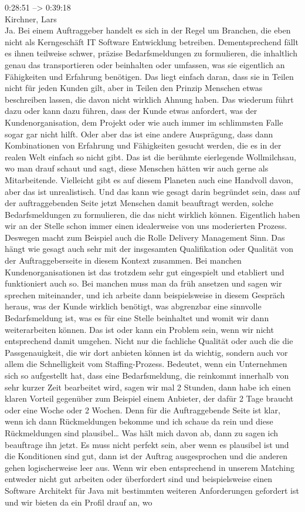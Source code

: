0:28:51 --> 0:39:18\\
Kirchner, Lars\\
Ja. Bei einem Auftraggeber handelt es sich in der Regel um Branchen, die eben nicht als Kerngeschäft IT Software Entwicklung betreiben. Dementsprechend fällt es ihnen teilweise schwer, präzise Bedarfsmeldungen zu formulieren, die inhaltlich genau das transportieren oder beinhalten oder umfassen, was sie eigentlich an Fähigkeiten und Erfahrung benötigen. Das liegt einfach daran, dass sie in Teilen nicht für jeden Kunden gilt, aber in Teilen den Prinzip Menschen etwas beschreiben lassen, die davon nicht wirklich Ahnung haben. Das wiederum führt dazu oder kann dazu führen, dass der Kunde etwas anfordert, was der Kundenorganisation, dem Projekt oder wie auch immer im schlimmsten Falle sogar gar nicht hilft. Oder aber das ist eine andere Ausprägung, dass dann Kombinationen von Erfahrung und Fähigkeiten gesucht werden, die es in der realen Welt einfach so nicht gibt. Das ist die berühmte eierlegende Wollmilchsau, wo man drauf schaut und sagt, diese Menschen hätten wir auch gerne als Mitarbeitende. Vielleicht gibt es auf diesem Planeten auch eine Handvoll davon, aber das ist unrealistisch. Und das kann wie gesagt darin begründet sein, dass auf der auftraggebenden Seite jetzt Menschen damit beauftragt werden, solche Bedarfsmeldungen zu formulieren, die das nicht wirklich können. Eigentlich haben wir an der Stelle schon immer einen idealerweise von uns moderierten Prozess. Deswegen macht zum Beispiel auch die Rolle Delivery Management Sinn. Das hängt wie gesagt auch sehr mit der insgesamten Qualifikation oder Qualität von der Auftraggeberseite in diesem Kontext zusammen. Bei manchen Kundenorganisationen ist das trotzdem sehr gut eingespielt und etabliert und funktioniert auch so. Bei manchen muss man da früh ansetzen und sagen wir sprechen miteinander, und ich arbeite dann beispielsweise in diesem Gespräch heraus, was der Kunde wirklich benötigt, was abgrenzbar eine sinnvolle Bedarfsmeldung ist, was es für eine Stelle beinhaltet und womit wir dann weiterarbeiten können. Das ist oder kann ein Problem sein, wenn wir nicht entsprechend damit umgehen. Nicht nur die fachliche Qualität oder auch die die Passgenauigkeit, die wir dort anbieten können ist da wichtig, sondern auch vor allem die Schnelligkeit vom Staffing-Prozess. Bedeutet, wenn ein Unternehmen sich so aufgestellt hat, dass eine Bedarfsmeldung, die reinkommt innerhalb von sehr kurzer Zeit bearbeitet wird, sagen wir mal 2 Stunden, dann habe ich einen klaren Vorteil gegenüber zum Beispiel einem Anbieter, der dafür 2 Tage braucht oder eine Woche oder 2 Wochen. Denn für die Auftraggebende Seite ist klar, wenn ich dann Rückmeldungen bekomme und ich schaue da rein und diese Rückmeldungen sind plausibel… Was hält mich davon ab, dann zu sagen ich beauftrage ihn jetzt. Es muss nicht perfekt sein, aber wenn es plausibel ist und die Konditionen sind gut, dann ist der Auftrag ausgesprochen und die anderen gehen logischerweise leer aus. Wenn wir eben entsprechend in unserem Matching entweder nicht gut arbeiten oder überfordert sind und beispielsweise einen Software Architekt für Java mit bestimmten weiteren Anforderungen gefordert ist und wir bieten da ein Profil drauf an, wo 